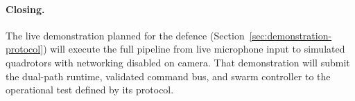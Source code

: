 \paragraph{Closing.} The live demonstration planned for the defence
(Section~\ref{sec:demonstration-protocol}) will execute the full pipeline from live microphone input to
simulated quadrotors with networking disabled on camera. That demonstration will submit the dual-path
runtime, validated command bus, and swarm controller to the operational test defined by its protocol.
